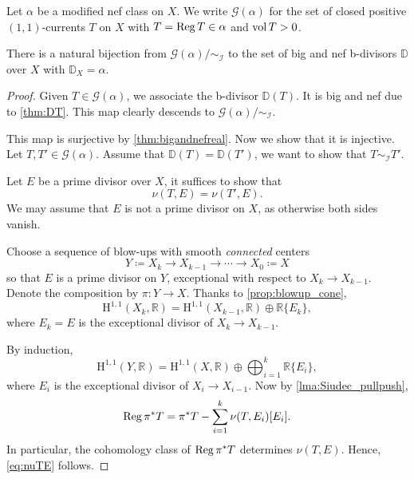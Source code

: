 Let $\alpha$ be a modified nef class on $X$. We write $\mathcal{G}(\alpha)$ for the set of closed positive $(1,1)$-currents $T$ on $X$ with $T=\operatorname{Reg} T\in \alpha$ and $\operatorname{vol} T>0$.
\begin{theorem}\label{thm:bdiv_current_corr}
    There is a natural bijection from $\mathcal{G}(\alpha)/\sim_{\mathcal{I}}$ to the set of big and nef b-divisors $\mathbb{D}$ over $X$ with $\mathbb{D}_X=\alpha$.
\end{theorem}
\begin{proof}


    Given $T\in \mathcal{G}(\alpha)$, we associate the b-divisor $\mathbb{D}(T)$. It is big and nef due to \cref{thm:DT}. This map clearly descends to $\mathcal{G}(\alpha)/\sim_{\mathcal{I}}$.

    This map is surjective by \cref{thm:bigandnefreal}. Now we show that it is injective. Let $T,T'\in \mathcal{G}(\alpha)$. Assume that $\mathbb{D}(T)=\mathbb{D}(T')$, we want to show that $T\sim_{\mathcal{I}} T'$.

    Let $E$ be a prime divisor over $X$, it suffices to show that
    \begin{equation}\label{eq:nuTE}
    \nu(T,E)=\nu(T',E).
    \end{equation}
    We may assume that $E$ is not a prime divisor on $X$, as otherwise both sides vanish.

    Choose a sequence of blow-ups with smooth \emph{connected} centers
    \[
    Y\coloneqq X_k\rightarrow X_{k-1}\rightarrow \cdots \rightarrow X_0\coloneqq X
    \]
    so that $E$ is a prime divisor on $Y$, exceptional with respect to $X_k\rightarrow X_{k-1}$. Denote the composition by $\pi\colon Y\rightarrow X$.
    Thanks to \cref{prop:blowup_cone},
    \[
    \mathrm{H}^{1,1}(X_k,\mathbb{R})=\mathrm{H}^{1,1}(X_{k-1},\mathbb{R})\oplus \mathbb{R}\{E_k\},
    \]
    where $E_k=E$ is the exceptional divisor of $X_k\rightarrow X_{k-1}$.

    By induction,
    \[
    \mathrm{H}^{1,1}(Y,\mathbb{R})=\mathrm{H}^{1,1}(X,\mathbb{R})\oplus \bigoplus_{i=1}^{k} \mathbb{R} \{E_i\},
    \]
    where $E_i$ is the exceptional divisor of $X_i\rightarrow X_{i-1}$. Now by \cref{lma:Siudec_pullpush},
    \begin{equation}\label{eq:RegpistarT}
    \operatorname{Reg} \pi^*T=\pi^*T-\sum_{i=1}^k \nu(T,E_i)[E_i].
    \end{equation}
    In particular, the cohomology class of $\operatorname{Reg} \pi^*T$ determines $\nu(T,E)$. Hence, \eqref{eq:nuTE} follows.
\end{proof}


